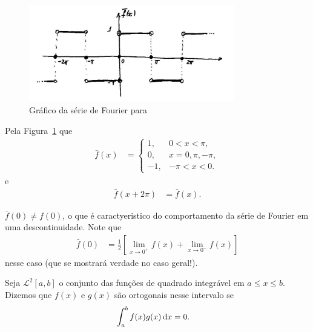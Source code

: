\begin{figure}[!htb]
    \centering
    \includegraphics[width=0.8\textwidth]{figuras/serie_fourier_grafico02.jpg}
    \caption{Gr\'{a}fico da s\'{e}rie de Fourier para }
    \label{fig:serie_fourier_grafico02}
\end{figure}

Pela Figura~\ref{fig:serie_fourier_grafico02} que
\begin{align*}
    \bar{f}(x) &= \begin{cases}
        1, & 0 < x < \pi, \\
        0, & x = 0, \pi, -\pi, \\
        -1, & -\pi < x < 0.
    \end{cases}
\end{align*}
e
\begin{align*}
    \bar{f}(x + 2 \pi) &= \bar{f}(x).
\end{align*}

\begin{obs}
    $\bar{f}(0) \neq f(0)$, o que \'{e} caractyeristico do comportamento da s\'{e}rie de Fourier em uma descontinuidade. Note que
    \begin{align*}
        \bar{f}(0) &= \frac{1}{2} \left[ \lim_{x \to 0^+} f(x) + \lim_{x \to 0^-} f(x) \right]
    \end{align*}
    nesse caso (que se mostrar\'{a} verdade no caso geral!).
\end{obs}

\begin{defi}
    Seja $\mathcal{L}^2[a, b]$ o conjunto das fun\c{c}\~{o}es de quadrado integr\'{a}vel em $a \leq x \leq b$. Dizemos que $f(x)$ e $g(x)$ s\~{a}o ortogonais nesse intervalo se
    \begin{align*}
        \int_a^b f(x) g(x) \, \mathrm{d}x &= 0.
    \end{align*}
\end{defi}

